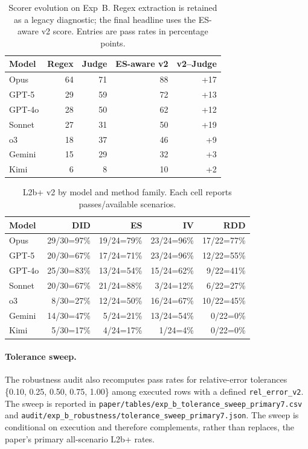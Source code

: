 \documentclass{article}
\begin{document}
\begin{table}[h]
\centering
\caption{Scorer evolution on Exp~B. Regex extraction is retained as a legacy
diagnostic; the final headline uses the ES-aware v2 score. Entries are pass
rates in percentage points.}
\label{tab:scorer-evolution}
\small
\renewcommand{\arraystretch}{1.08}
\begin{tabular}{lrrrr}
\toprule
\textbf{Model} & \textbf{Regex} & \textbf{Judge} &
\textbf{ES-aware v2} & \textbf{v2--Judge} \\
\midrule
Opus & 64 & 71 & 88 & +17 \\
GPT-5 & 29 & 59 & 72 & +13 \\
GPT-4o & 28 & 50 & 62 & +12 \\
Sonnet & 27 & 31 & 50 & +19 \\
o3 & 18 & 37 & 46 & +9 \\
Gemini & 15 & 29 & 32 & +3 \\
Kimi & 6 & 8 & 10 & +2 \\
\bottomrule
\end{tabular}
\end{table}

\begin{table}[h]
\centering
\caption{L2b+ v2 by model and method family. Each cell reports
passes/available scenarios.}
\label{tab:l2b-method}
\small
\renewcommand{\arraystretch}{1.08}
\begin{tabular}{lrrrr}
\toprule
\textbf{Model} & \textbf{DID} & \textbf{ES} & \textbf{IV} & \textbf{RDD} \\
\midrule
Opus & 29/30=97\% & 19/24=79\% & 23/24=96\% & 17/22=77\% \\
GPT-5 & 20/30=67\% & 17/24=71\% & 23/24=96\% & 12/22=55\% \\
GPT-4o & 25/30=83\% & 13/24=54\% & 15/24=62\% & 9/22=41\% \\
Sonnet & 20/30=67\% & 21/24=88\% & 3/24=12\% & 6/22=27\% \\
o3 & 8/30=27\% & 12/24=50\% & 16/24=67\% & 10/22=45\% \\
Gemini & 14/30=47\% & 5/24=21\% & 13/24=54\% & 0/22=0\% \\
Kimi & 5/30=17\% & 4/24=17\% & 1/24=4\% & 0/22=0\% \\
\bottomrule
\end{tabular}
\end{table}

\paragraph{Tolerance sweep.}
The robustness audit also recomputes pass rates for relative-error tolerances
\{0.10, 0.25, 0.50, 0.75, 1.00\} among executed rows with a defined
\texttt{rel\_error\_v2}. The sweep is reported in
\texttt{paper/tables/exp\_b\_tolerance\_sweep\_primary7.csv} and
\texttt{audit/exp\_b\_robustness/tolerance\_sweep\_primary7.json}. The sweep is
conditional on execution and therefore complements, rather than replaces, the
paper's primary all-scenario L2b+ rates.
\end{document}
